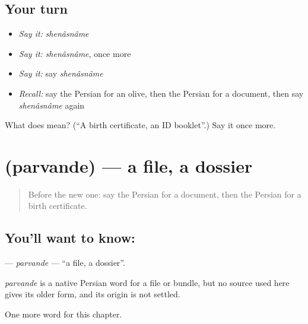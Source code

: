 \subsection*{Your turn}
\begin{itemize}
\raggedright
  \item \emph{Say it:} \emph{shenâsnâme}
  \item \emph{Say it:} \emph{shenâsnâme}, once more
  \item \emph{Say it:} say \emph{shenâsnâme}
  \item \emph{Recall:} say the Persian for an olive, then the Persian for a document, then say \emph{shenâsnâme} again
\end{itemize}

\begin{tcolorbox}[breakable,colback=teal!4,colframe=teal!35!black,title={Before you move on}]
What does  mean? (\textquotedblleft{}A birth certificate, an ID booklet\textquotedblright{}.) Say it once more.
\end{tcolorbox}
\section[\texorpdfstring{\fa{پرونده} (parvande)}{پرونده (parvande)}]{ (parvande) — a file, a dossier}

\label{lesson:FA-C206-parvande}



\begin{quote}
Before the new one: say the Persian for a document, then the Persian for a birth certificate.
\end{quote}

\subsection*{You'll want to know: }
\textbf{} — \emph{parvande} — \textquotedblleft{}a file, a dossier\textquotedblright{}.

\begin{cousinweb}
\emph{parvande} is a native Persian word for a file or bundle, but no source used here gives its older form, and its origin is not settled.
\end{cousinweb}

\begin{grammarlens}[title={What you've built}]
One more word for this chapter.
\end{grammarlens}

